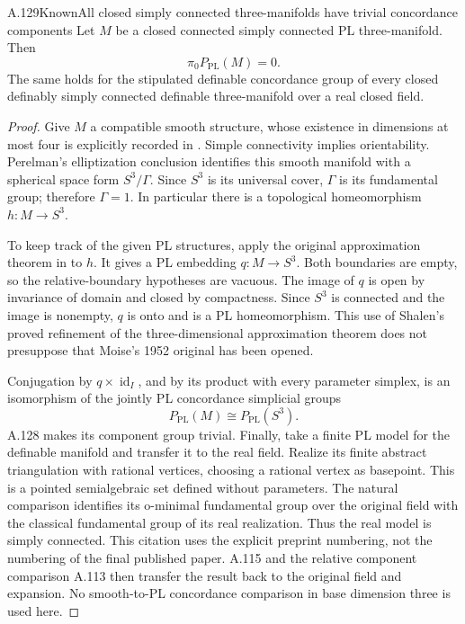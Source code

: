 \begin{saresult}{A.129}{Known}{All closed simply connected three-manifolds have trivial concordance components}
Let $M$ be a closed connected simply connected PL three-manifold. Then
\[
  \pi_0P_{\mathrm{PL}}(M)=0.
\]
The same holds for the stipulated definable concordance group of every
closed definably simply connected definable three-manifold over a real
closed field.
\end{saresult}
\begin{proof}
Give $M$ a compatible smooth structure, whose existence in dimensions
at most four is explicitly recorded in
\cite[Essay~I, p.~39]{KirbySiebenmann1977}.
Simple connectivity implies orientability. Perelman's elliptization
conclusion \cite[Section~1.4, p.~3]{Perelman2003Extinction} identifies
this smooth manifold with a spherical space form $S^3/\Gamma$.
Since $S^3$ is its universal cover, $\Gamma$ is its fundamental group;
therefore $\Gamma=1$. In particular there is a topological homeomorphism
$h:M\longrightarrow S^3$.

To keep track of the given PL structures, apply the original
approximation theorem in
\cite[Approximation Theorem, p.~34; proof Section~9, pp.~75--79]{Shalen1984}
to $h$. It gives a PL embedding $q:M\longrightarrow S^3$.
Both boundaries are empty, so the relative-boundary hypotheses are
vacuous. The image of $q$ is open by invariance of domain and closed
by compactness. Since $S^3$ is connected and the image is nonempty,
$q$ is onto and is a PL homeomorphism. This use of Shalen's proved
refinement of the three-dimensional approximation theorem does not
presuppose that Moise's 1952 original has been opened.

Conjugation by $q\times\operatorname{id}_I$, and by its product with
every parameter simplex, is an isomorphism of the jointly PL
concordance simplicial groups
\[
  P_{\mathrm{PL}}(M)\cong P_{\mathrm{PL}}(S^3).
\]
A.128 makes its component group trivial. Finally, take a finite PL
model for the definable manifold and transfer it to the real field.
Realize its finite abstract triangulation with rational vertices,
choosing a rational vertex as basepoint. This is a pointed
semialgebraic set defined without parameters. The natural comparison
\cite[arXiv version~1, Corollary~4.3, p.~10]{BaroOtero2008v1}
identifies its o-minimal fundamental group over the original field
with the classical fundamental group of its real realization. Thus
the real model is simply connected. This citation uses the explicit
preprint numbering, not the numbering of the final published paper.
A.115 and the relative component comparison A.113 then
transfer the result back to the original field and expansion.
No smooth-to-PL concordance comparison in base dimension three is
used here.
\end{proof}
